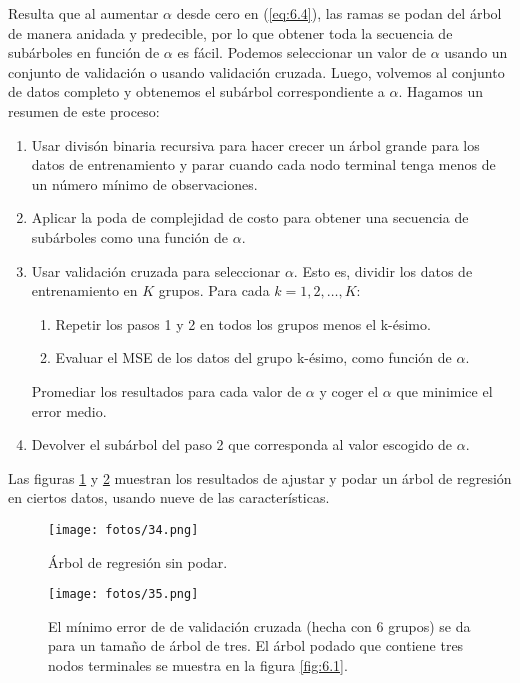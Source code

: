 Resulta que al aumentar $\alpha$ desde cero en (\ref{eq:6.4}), las ramas se podan del árbol de manera anidada y predecible, por lo que obtener toda la secuencia de subárboles en función de $\alpha$ es fácil. Podemos seleccionar un valor de
$\alpha$ usando un conjunto de validación o usando validación cruzada. Luego, volvemos al conjunto de datos completo y obtenemos el subárbol correspondiente a $\alpha$. Hagamos un resumen de este proceso:
\begin{enumerate}
\item Usar divisón binaria recursiva para hacer crecer un árbol grande para los datos de entrenamiento y parar cuando cada nodo terminal tenga menos de un número mínimo de observaciones.
\item Aplicar la poda de complejidad de costo para obtener una secuencia de subárboles como una función de $\alpha$.
\item Usar validación cruzada para seleccionar $\alpha$. Esto es, dividir los datos de entrenamiento en $K$ grupos. Para cada $k = 1, 2, \ldots, K$:
\begin{enumerate}
\item Repetir los pasos 1 y 2 en todos los grupos menos el k-ésimo.
\item Evaluar el MSE de los datos del grupo k-ésimo, como función de $\alpha$. 
\end{enumerate}
Promediar los resultados para cada valor de $\alpha$ y coger el $\alpha$ que minimice el error medio.
\item Devolver el subárbol del paso 2 que corresponda al valor escogido de $\alpha$.
\end{enumerate}

Las figuras \ref{fig:6.4} y \ref{fig:6.5} muestran los resultados de ajustar y podar un árbol de regresión en ciertos datos, usando nueve de las características.

\begin{figure}[h]
\centering
\texttt{[image: fotos/34.png]}
\caption{Árbol de regresión sin podar.}
\label{fig:6.4}
\end{figure}

\begin{figure}[h]
\centering
\texttt{[image: fotos/35.png]}
\caption{El mínimo error de de validación cruzada (hecha con 6 grupos) se da para un tamaño de árbol de tres. El árbol podado que contiene tres nodos terminales se muestra en la figura \ref{fig:6.1}.}
\label{fig:6.5}
\end{figure}


